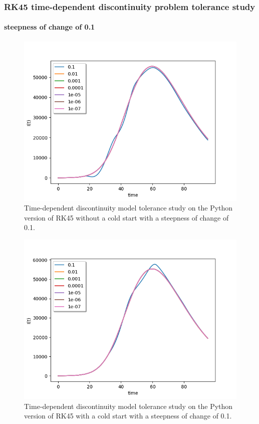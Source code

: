 \subsubsection{RK45 time-dependent discontinuity problem tolerance study}
\paragraph{steepness of change of 0.1}

\begin{figure}[H]
\centering
\includegraphics[width=0.7\linewidth]{./figures/exp_time_tol_rk45_no_event_0_1}
\caption{Time-dependent discontinuity model tolerance study on the Python version of RK45 without a cold start with a steepness of change of 0.1.}
\label{fig:exp_time_tol_rk45_no_event_0_1}
\end{figure}

\begin{figure}[H]
\centering
\includegraphics[width=0.7\linewidth]{./figures/exp_time_tol_rk45_event_0_1}
\caption{Time-dependent discontinuity model tolerance study on the Python version of RK45 with a cold start with a steepness of change of 0.1.}
\label{fig:exp_time_tol_rk45_event_0_1}
\end{figure}


